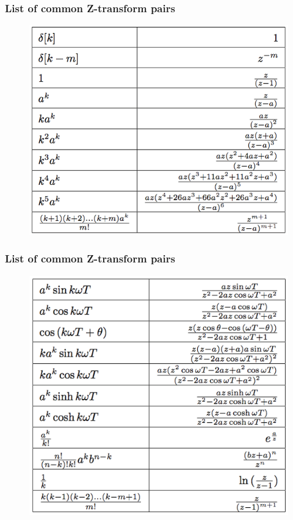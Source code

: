 \begin{frame}
	\frametitle{List of common Z-transform pairs}
	\begin{figure}
\centering
\includegraphics[height=0.8\textheight]{Images/discrete_time_systems_22}

\label{fig:discrete_time_systems_22}
\end{figure}

	
\end{frame}
\begin{frame}
	\frametitle{List of common Z-transform pairs}
	\begin{figure}
\centering
\includegraphics[height=0.8\textheight]{Images/discrete_time_systems_23}
\label{fig:discrete_time_systems_23}
\end{figure}

\end{frame}

